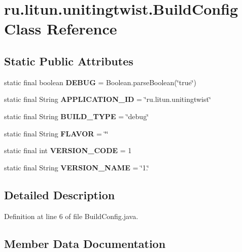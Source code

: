 \section{ru.\+litun.\+unitingtwist.\+Build\+Config Class Reference}
\label{classru_1_1litun_1_1unitingtwist_1_1_build_config}
\subsection*{Static Public Attributes}
\begin{DoxyCompactItemize}
\item 
static final boolean \textbf{ D\+E\+B\+UG} = Boolean.\+parse\+Boolean(\char`\"{}true\char`\"{})
\item 
static final String \textbf{ A\+P\+P\+L\+I\+C\+A\+T\+I\+O\+N\+\_\+\+ID} = \char`\"{}ru.\+litun.\+unitingtwist\char`\"{}
\item 
static final String \textbf{ B\+U\+I\+L\+D\+\_\+\+T\+Y\+PE} = \char`\"{}debug\char`\"{}
\item 
static final String \textbf{ F\+L\+A\+V\+OR} = \char`\"{}\char`\"{}
\item 
static final int \textbf{ V\+E\+R\+S\+I\+O\+N\+\_\+\+C\+O\+DE} = 1
\item 
static final String \textbf{ V\+E\+R\+S\+I\+O\+N\+\_\+\+N\+A\+ME} = \char`\"{}1.\char`\"{}
\end{DoxyCompactItemize}


\subsection{Detailed Description}


Definition at line 6 of file Build\+Config.\+java.



\subsection{Member Data Documentation}
\mbox{\label{classru_1_1litun_1_1unitingtwist_1_1_build_config_acaf322f1fc7760ff4fdd44a8b5dcf3a8}} 
